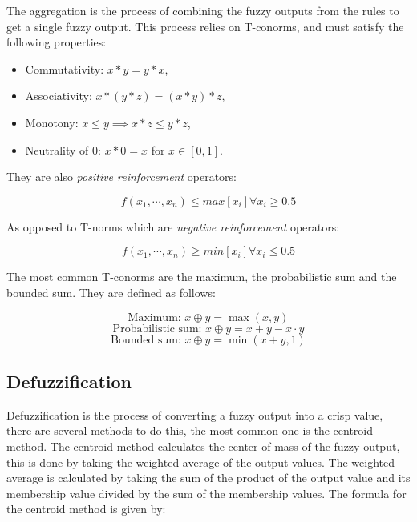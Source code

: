 The aggregation is the process of combining the fuzzy outputs from the rules to get a single fuzzy output. This process
relies on T-conorms, and must satisfy the following properties:

\begin{itemize}
  \item Commutativity: $x * y = y * x$,
  \item Associativity: $x * (y * z) = (x * y) * z$,
  \item Monotony: $x \leq y \implies x * z \leq y * z$,
  \item Neutrality of 0: $x * 0 = x$ for $x \in [0, 1]$.
\end{itemize}

They are also \textit{positive reinforcement} operators:

\begin{equation}
  f(x_1, \cdots, x_n) \leq max[x_i] \forall x_i \geq 0.5
\end{equation}

As opposed to T-norms which are \textit{negative reinforcement} operators:

\begin{equation}
  f(x_1, \cdots, x_n) \geq min[x_i] \forall x_i \leq 0.5
\end{equation}

The most common T-conorms are the maximum, the probabilistic sum and the bounded sum. They are defined as follows:

\begin{minipage}{0.9624\textwidth}
  \begin{equation}
    \text{Maximum: } x \oplus y = \max(x, y)
  \end{equation}
  \begin{equation}
    \text{Probabilistic sum: } x \oplus y = x + y - x \cdot y
  \end{equation}
  \begin{equation}
    \text{Bounded sum: } x \oplus y = \min(x + y, 1)
  \end{equation}
\end{minipage}

\subsection{Defuzzification}
\label{subsec:fuzzy-defuzzification}

Defuzzification is the process of converting a fuzzy output into a crisp value, there are several methods to do this,
the most common one is the centroid method. The centroid method calculates the center of mass of the fuzzy output, this
is done by taking the weighted average of the output values. The weighted average is calculated by taking the sum of
the product of the output value and its membership value divided by the sum of the membership values. The formula for
the centroid method is given by:

